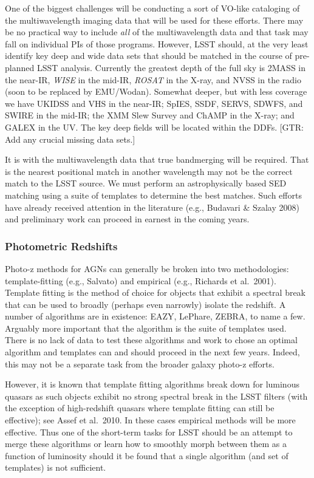 One of the biggest challenges will be conducting a sort of VO-like cataloging of the multiwavelength imaging data that will be used for these efforts.  There may be no practical way to include {\em all} of the multiwavelength data and that task may fall on individual PIs of those programs.  However, LSST should, at the very least identify key deep and wide data sets that should be matched in the course of pre-planned LSST analysis.  Currently the greatest depth of the full sky is 2MASS in the near-IR, {\em WISE} in the mid-IR, {\em ROSAT} in the X-ray, and NVSS in the radio (soon to be replaced by EMU/Wodan).  Somewhat deeper, but with less coverage we have UKIDSS and VHS in the near-IR; SpIES, SSDF, SERVS, SDWFS, and SWIRE in the mid-IR; the XMM Slew Survey and ChAMP in the X-ray; and GALEX in the UV.   The key deep fields will be located within the DDFs.  [GTR: Add any crucial missing data sets.]

It is with the multiwavelength data that true bandmerging will be required.  That is the nearest positional match in another wavelength may not be the correct match to the LSST source.  We must perform an astrophysically based SED matching using a suite of templates to determine the best matches.  Such efforts have already received attention in the literature (e.g., Budavari \& Szalay 2008) and preliminary work can proceed in earnest in the coming years.

\subsubsection{Photometric Redshifts}

Photo-z methods for AGNs can generally be broken into two methodologies: template-fitting (e.g., Salvato) and empirical (e.g., Richards et al.\ 2001).  Template fitting is the method of choice for objects that exhibit a spectral break that can be used to broadly (perhaps even narrowly) isolate the redshift.   A number of algorithms are in existence: EAZY, LePhare, ZEBRA, to name a few.  Arguably more important that the algorithm is the suite of templates used.   There is no lack of data to test these algorithms and work to chose an optimal algorithm and templates can and should proceed in the next few years.  Indeed, this may not be a separate task from the broader galaxy photo-z efforts.

However, it is known that template fitting algorithms break down for luminous quasars as such objects exhibit no strong spectral break in the LSST filters (with the exception of high-redshift quasars where template fitting can still be effective); see Assef et al.\ 2010.  In these cases empirical methods will be more effective.  Thus one of the short-term tasks for LSST should be an attempt to merge these algorithms or learn how to smoothly morph between them as a function of luminosity should it be found that a single algorithm (and set of templates) is not sufficient.

